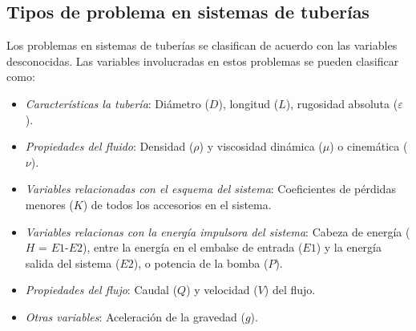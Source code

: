 \documentclass[11pt, oneside]{article}
\begin{document}
\subsection{Tipos de problema en sistemas de tuber\'ias}
Los problemas en sistemas de tuber\'ias se clasifican de acuerdo con las variables desconocidas. Las variables involucradas en estos problemas se pueden clasificar como:
\begin{itemize}
\item \emph{Caracter\'isticas la tuber\'ia}: Di\'ametro ($D$), longitud ($L$), rugosidad absoluta ($\varepsilon$).
\item \emph{Propiedades del fluido}: Densidad ($\rho$) y viscosidad din\'amica ($\mu$) o cinem\'atica ($\nu$). 
\item \emph{Variables relacionadas con el esquema del sistema}: Coeficientes de p\'erdidas menores ($K$) de todos los accesorios en el sistema. 
\item \emph{Variables relacionas con la energ\'ia impulsora del sistema}: Cabeza de energ\'ia ($H$ = $E1$-$E2$), entre la energ\'ia en el embalse de entrada ($E1$) y la energ\'ia salida del sistema ($E2$), o potencia de la bomba ($P$). 
\item \emph{Propiedades del flujo}: Caudal ($Q$) y velocidad ($V$) del flujo.
\item \emph{Otras variables}: Aceleraci\'on de la gravedad ($g$).
\end{itemize}
 
\end{document}
